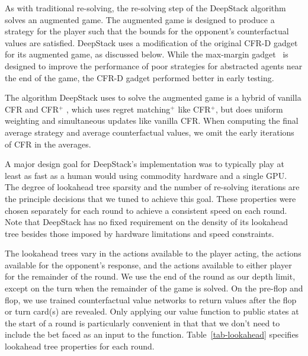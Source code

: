 As with traditional re-solving, the re-solving step of the DeepStack algorithm solves an augmented game.  The augmented game is designed to produce a strategy for the player such that the bounds for the opponent's counterfactual values are satisfied.  DeepStack uses a modification of the original CFR-D gadget~\cite{cprg:cfrd} for its augmented game, as discussed below.  While the max-margin gadget~\cite{Moravcik16:Subgames} is designed to improve the performance of poor strategies for abstracted agents near the end of the game, the CFR-D gadget performed better in early testing.

The algorithm DeepStack uses to solve the augmented game is a hybrid of vanilla CFR  \cite{ZinkevichEtAl07} and CFR$^+$ \cite{Tammelin15:CFR+}, which uses regret matching$^+$ like CFR$^+$, but does uniform weighting and simultaneous updates like vanilla CFR.  When computing the final average strategy and average counterfactual values, we omit the early iterations of CFR in the averages.

A major design goal for DeepStack's implementation was to typically play at least as fast as a human would using commodity hardware and a single GPU.
The degree of lookahead tree sparsity and the number of re-solving iterations are the principle decisions that we tuned to achieve this goal.
These properties were chosen separately for each round to achieve a consistent speed on each round. Note that DeepStack has no fixed requirement on the density of its lookahead tree besides those imposed by hardware limitations and speed constraints.

The lookahead trees vary in the actions available to the player acting, the actions available for the opponent's response, and the actions available to either player for the remainder of the round. 
We use the end of the round as our depth limit, except on the turn when the remainder of the game is solved.  
On the pre-flop and flop, we use trained counterfactual value networks to return values after the flop or turn card(s) are revealed.
Only applying our value function to public states at the start of a round is particularly convenient in that that we don't need to include the bet faced as an input to the function.  
Table~\ref{tab-lookahead} specifies lookahead tree properties for each round. 

\def\halfP{\textonehalf{}P}
\def\twoP{2P}

